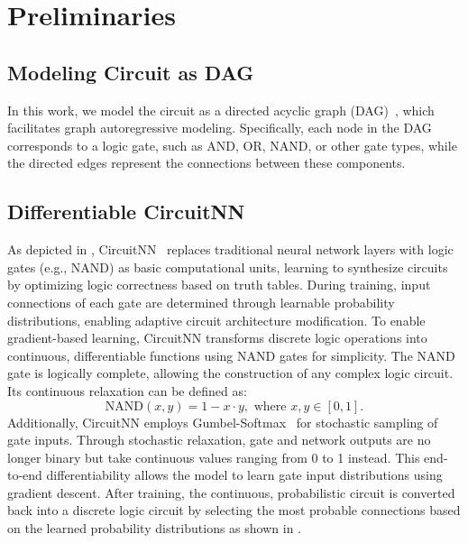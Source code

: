 \section{Preliminaries}

\subsection{Modeling Circuit as DAG}
In this work, we model the circuit as a directed acyclic graph (DAG)~\cite{brummayer2006circuitdag}, which facilitates graph autoregressive modeling. 
Specifically, each node in the DAG corresponds to a logic gate, such as AND, OR, NAND, or other gate types, while the directed edges represent the connections between these components.

\subsection{Differentiable CircuitNN}
As depicted in , CircuitNN~\cite{deepmind2024ai4sys} replaces traditional neural network layers with logic gates (e.g., NAND) as basic computational units, learning to synthesize circuits by optimizing logic correctness based on truth tables.
During training, input connections of each gate are determined through learnable probability distributions, enabling adaptive circuit architecture modification.
To enable gradient-based learning, CircuitNN transforms discrete logic operations into continuous, differentiable functions using NAND gates for simplicity. 
The NAND gate is logically complete, allowing the construction of any complex logic circuit.
Its continuous relaxation can be defined as:
\begin{equation}
\text{NAND}(x,y) = 1 - x \cdot y, \text{ where } x,y \in [0, 1].
\end{equation}
Additionally, CircuitNN employs Gumbel-Softmax~\cite{jang2016gumbel} for stochastic sampling of gate inputs. 
Through stochastic relaxation, gate and network outputs are no longer binary but take continuous values ranging from 0 to 1 instead. 
This end-to-end differentiability allows the model to learn gate input distributions using gradient descent.
After training, the continuous, probabilistic circuit is converted back into a discrete logic circuit by selecting the most probable connections based on the learned probability distributions as shown in .